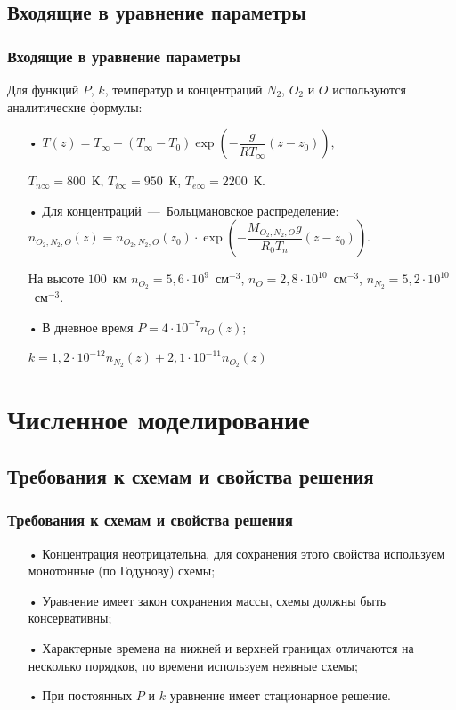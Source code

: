 \documentclass[9pt, apectratio=43,unicode]{beamer}
\begin{document}
\subsection{Входящие в уравнение параметры}
\begin{frame}\frametitle{Входящие в уравнение параметры}
Для функций $P$, $k$, температур и концентраций $N_2$, $O_2$ и $O$ используются аналитические формулы: 

\begin{itemize}
\item[•] $T(z)=T_\infty - (T_\infty-T_0)\exp\left(-\dfrac{g}{RT_\infty}(z-z_0)\right),$ 

$T_{n\infty}=800$~К, $T_{i\infty}=950$~К, $T_{e\infty}=2200$~К.

\smallskip

\item[•] Для концентраций~---~Больцмановское распределение: $n_{O_2, N_2, O} (z)= n_{O_2, N_2, O} (z_0)\cdot \exp\left(-\dfrac{M_{O_2, N_2, O}g}{R_0T_n}(z-z_0)\right).$ 

На высоте $100$~км $n_{O_2} = 5{,}6\cdot 10^9$~см$^{-3}$, $n_{O} = 2{,}8\cdot 10^{10}$~см$^{-3}$, $n_{N_2} = 5{,}2\cdot 10^{10}$~см$^{-3}$.

\smallskip


\item[•] В дневное время $P=4\cdot10^{-7}n_O(z)$;

$k=1{,}2\cdot10^{-12}n_{N_2}(z)+2{,}1\cdot10^{-11}n_{O_2}(z)$
\end{itemize}

\end{frame}


\section{Численное моделирование}
\subsection{Требования к схемам и свойства решения}
\begin{frame}\frametitle{Требования к схемам и свойства решения}

\begin{itemize}
\item[•] Концентрация неотрицательна, для сохранения этого свойства используем монотонные (по Годунову) схемы;
\item[•] Уравнение имеет закон сохранения массы, схемы должны быть консервативны;
\item[•] Характерные времена на нижней и верхней границах отличаются на несколько порядков, по времени используем неявные схемы;
\item[•] При постоянных $P$ и $k$ уравнение имеет стационарное решение.
\end{itemize}

\end{frame}
\end{document}
